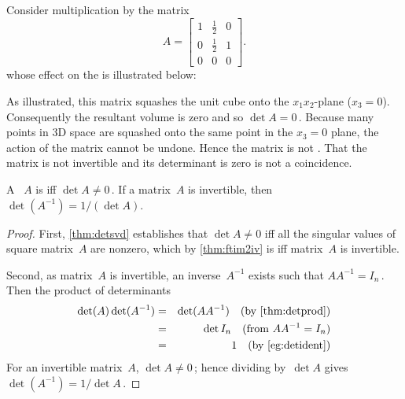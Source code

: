 \begin{example} \label{eg:detzerorow}
Consider multiplication by the matrix 
\begin{equation*}
A=\begin{bmatrix} 1&\frac12&0
\\0&\frac12&1 \\0&0&0 \end{bmatrix}.
\end{equation*}
whose effect on the  is illustrated below:
\begin{center}
\end{center}
As illustrated, this matrix squashes the unit cube onto the \(x_1x_2\)-plane (\(x_3=0\)).
Consequently the resultant volume is zero and so \(\det A=0\)\,.
Because many points in 3D space are squashed onto the same point in the \(x_3=0\) plane, the action of the matrix cannot be undone.  
Hence the matrix is not . 
That the matrix is not invertible and its determinant is zero is not a coincidence.
\end{example}


\begin{theorem} \label{thm:detinv} 
A ~\(A\) is  iff \(\det A\neq 0\)\,.
If a matrix~\(A\) is invertible, then \(\det(A^{-1})=1/(\det A)\).
\end{theorem}
\begin{proof} 
First, \autoref{thm:detsvd} establishes that \(\det A\neq 0\) iff all the singular values of square matrix~\(A\) are nonzero, which by \autoref{thm:ftim2iv} is iff matrix~\(A\) is invertible.

Second, as matrix~\(A\) is invertible, an inverse~\(A^{-1}\) exists such that \(AA^{-1}=I_n\)\,.
Then the product of determinants
\begin{eqnarray*}
\det(A)\det(A^{-1})
&=&\det(AA^{-1}) \quad(\text{by \autoref{thm:detprod}})
\\&=&\det I_n\quad(\text{from }AA^{-1}=I_n)
\\&=&1\quad(\text{by \autoref{eg:detident}})
\end{eqnarray*}
For an invertible matrix~\(A\), \(\det A\neq 0\)\,; hence
dividing by~\(\det A\) gives \(\det(A^{-1})=1/\det A\)\,.
\end{proof}






\sectionExercises



